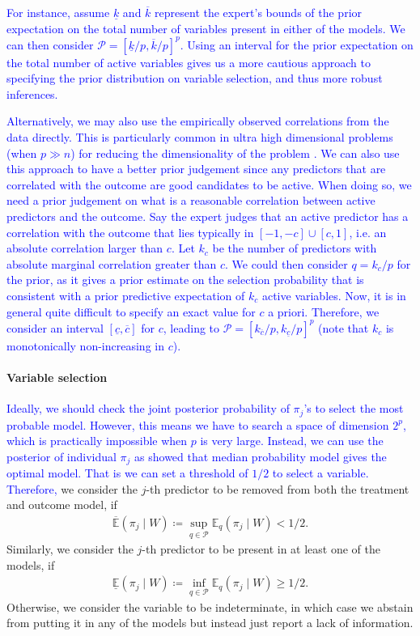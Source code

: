\documentclass[preprint,12pt]{elsarticle}
\newcommand{\lexp}{\underline{\mathbb{E}}}
\newcommand{\uexp}{\overline{\mathbb{E}}}
\newcommand{\added}[1]{\textcolor{blue}{#1}}
\begin{document}
\added{%
For instance, assume $\underline{k}$ and $\overline{k}$ represent the expert's bounds of the prior expectation on the
total number of variables present in either of the models. We can then consider $\mathcal{P}=\left[\underline{k}/p, \overline{k}/p\right]^p$.
Using an interval for the prior expectation on the total number of active variables
gives us a more cautious approach to specifying the prior distribution on variable selection,
and thus more robust inferences.%
}

\added{%
Alternatively, we may also use the empirically observed correlations from the data directly. This is particularly common in ultra high
dimensional problems (when $p\gg n$) for reducing the dimensionality
of the problem \citep{fan2008}. We can also use this approach
to have a better prior judgement since any predictors that are correlated with the outcome are good candidates to be active.
When doing so, we need
a prior judgement on what is a reasonable
correlation between active predictors and the outcome.
Say the expert judges that
an active predictor has a correlation with the outcome
that lies typically in $[-1,-c]\cup[c,1]$, i.e.
an absolute correlation larger than $c$.
Let $k_c$ be the number of predictors with absolute marginal correlation greater than $c$.
We could then consider $q=k_c/p$ for the prior, as it gives a prior estimate on the selection probability that is consistent with a prior predictive expectation of $k_c$ active variables.
Now, it is in general quite difficult to specify an exact value for $c$ a priori.
Therefore, we consider an interval $[\underline{c},\overline{c}]$ for $c$, leading to
$\mathcal{P}=\left[k_{\overline{c}}/p, k_{\underline{c}}/p\right]^p$
(note that $k_c$ is monotonically non-increasing in $c$).
}

\paragraph{Variable selection}
\added{Ideally, we should check the joint posterior probability of $\pi_j$'s to select the most probable model. However, this means we have to search a space of dimension $2^p$, which is practically impossible when $p$ is very large. Instead, we can use the posterior of individual $\pi_j$ as \citet{barbieri2004} showed that median probability model gives the optimal model. That is we can set a threshold of $1/2$ to select a variable. Therefore,}
we consider the $j$-th predictor to be removed from both the
treatment and outcome model, if
\begin{align}\label{eq:vs:remove}
	\uexp (\pi_j\mid W)\coloneqq \sup_{q\in \mathcal{P}} \mathbb{E}_q(\pi_j\mid W) < 1/2.
\end{align}
Similarly, we consider the $j$-th predictor to be present in at least one of the models, if
\begin{align}\label{eq:vs:sel}
	\lexp (\pi_j\mid W)\coloneqq \inf_{q\in \mathcal{P}} \mathbb{E}_q(\pi_j\mid W) \ge 1/2.
\end{align}
Otherwise, we consider the variable to be indeterminate,  in which case we abstain from putting
it in any of the models but instead just report a lack of information.
\end{document}
